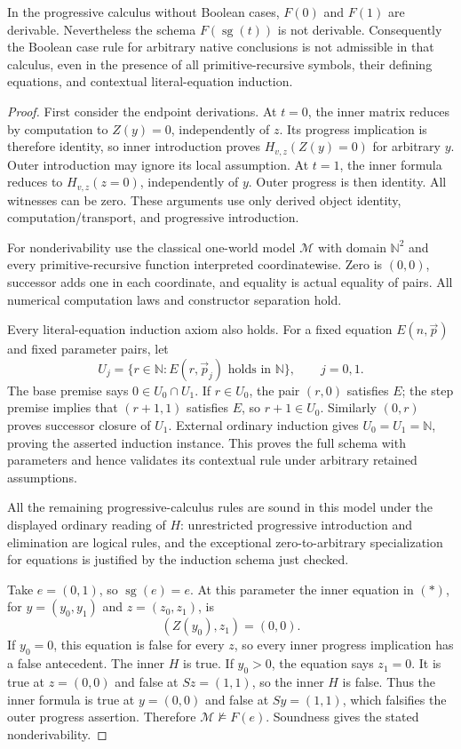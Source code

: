 \begin{theorem}
In the progressive calculus without Boolean cases, $F(0)$ and $F(1)$
are derivable. Nevertheless the schema $F(\operatorname{sg}(t))$ is not
derivable. Consequently the Boolean case rule for arbitrary native
conclusions is not admissible in that calculus, even in the presence of
all primitive-recursive symbols, their defining equations, and contextual
literal-equation induction.
\end{theorem}
\begin{proof}
First consider the endpoint derivations. At $t=0$, the inner matrix
reduces by computation to $Z(y)=0$, independently of $z$. Its progress
implication is therefore identity, so inner introduction proves
$H_{v,z}(Z(y)=0)$ for arbitrary $y$. Outer introduction may ignore its
local assumption. At $t=1$, the inner formula reduces to
$H_{v,z}(z=0)$, independently of $y$. Outer progress is then identity.
All witnesses can be zero. These arguments use only derived object identity,
computation/transport, and progressive introduction.

For nonderivability use the classical one-world model $\mathcal M$ with
domain $\mathbb N^2$ and every primitive-recursive function interpreted
coordinatewise. Zero is $(0,0)$, successor adds one in each coordinate,
and equality is actual equality of pairs. All numerical computation
laws and constructor separation hold.

Every literal-equation induction axiom also holds. For a fixed equation
$E(n,\vec p)$ and fixed parameter pairs, let
\[
 U_j=\{r\in\mathbb N:E(r,\vec p_j)\text{ holds in }\mathbb N\},
 \qquad j=0,1.
\]
The base premise says $0\in U_0\cap U_1$. If $r\in U_0$, the pair
$(r,0)$ satisfies $E$; the step premise implies that $(r+1,1)$ satisfies
$E$, so $r+1\in U_0$. Similarly $(0,r)$ proves successor closure of
$U_1$. External ordinary induction gives $U_0=U_1=\mathbb N$, proving
the asserted induction instance. This proves the full schema with
parameters and hence validates its contextual rule under arbitrary
retained assumptions.

All the remaining progressive-calculus rules are sound in this model
under the displayed ordinary reading of $H$: unrestricted progressive
introduction and elimination are logical rules, and the exceptional
zero-to-arbitrary specialization for equations is justified by the
induction schema just checked.

Take $e=(0,1)$, so $\operatorname{sg}(e)=e$. At this parameter the
inner equation in $(*)$, for $y=(y_0,y_1)$ and $z=(z_0,z_1)$, is
\[
                    (Z(y_0),z_1)=(0,0).
\]
If $y_0=0$, this equation is false for every $z$, so every inner
progress implication has a false antecedent. The inner $H$ is true.
If $y_0>0$, the equation says $z_1=0$. It is true at $z=(0,0)$ and
false at $Sz=(1,1)$, so the inner $H$ is false. Thus the inner formula
is true at $y=(0,0)$ and false at $Sy=(1,1)$, which falsifies the
outer progress assertion. Therefore $\mathcal M\not\models F(e)$.
Soundness gives the stated nonderivability.


\end{proof}
